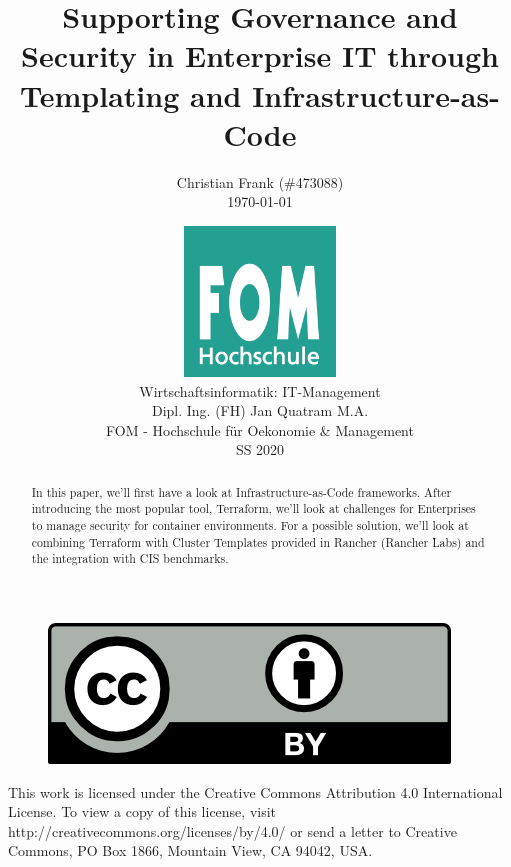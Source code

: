 \documentclass[12pt,a4paper,listof=totoc,bibliography=totoc]{scrartcl}
\newcommand\svthema{Supporting Governance and Security in Enterprise IT through Templating and Infrastructure-as-Code}
\newcommand\svperson{Christian Frank (\#473088)}
\newcommand\svdatum{\today}
\newcommand\lvname{Wirtschaftsinformatik: IT-Management}
\newcommand\lvtyp{SS 2020}
\newcommand\lvinst{FOM - Hochschule für Oekonomie \& Management}
\newcommand\lvbetr{Dipl. Ing. (FH) Jan Quatram M.A.}
\begin{document}
\title{ \huge\textbf{\svthema} }
\author{ {\svperson} \\ \svdatum }
\date{ \normalsize \centering \includegraphics[width=0.3\textwidth]{FOM}\\ {\lvname} \\ {\lvbetr} \\ {\lvinst} \\ {\lvtyp} }

\pagestyle{fancy}
\fancyhf{}
\fancyhf[ch]{\thepage}
\renewcommand\headrulewidth{0pt}

\maketitle
\thispagestyle{empty} %

\begin{abstract}
In this paper, we'll first have a look at Infrastructure-as-Code frameworks. After introducing the most popular tool, Terraform, we'll look at challenges for Enterprises to manage security for container environments.
For a possible solution, we'll look at combining Terraform with Cluster Templates provided in Rancher (Rancher Labs) and the integration with CIS benchmarks.

\end{abstract}

\vfill
\begin{figure}[h]
    \centering
    \includegraphics[]{CC-BY}
\end{figure}

This work is licensed under the Creative Commons Attribution 4.0 International License. To view a copy of this license, visit http://creativecommons.org/licenses/by/4.0/ or send a letter to Creative Commons, PO Box 1866, Mountain View, CA 94042, USA.
\end{document}
